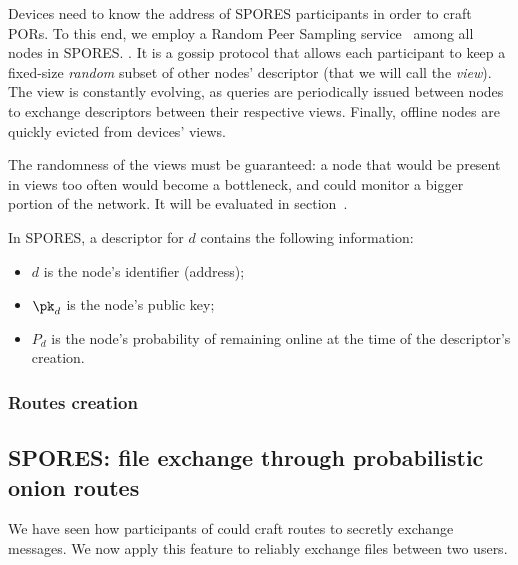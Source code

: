 Devices need to know the address of SPORES participants in order to craft PORs.
To this end, we employ a Random Peer Sampling service~\cite{Jelasity_Voulgaris_Guerraoui_Kermarrec_van_Steen_2007} among all nodes in SPORES. .
It is a gossip protocol that allows each participant to keep a fixed-size \emph{random} subset of other nodes' descriptor (that we will call the \emph{view}). 
The view is constantly evolving, as queries are periodically issued between nodes to exchange descriptors between their respective views.
Finally, offline nodes are quickly evicted from devices' views.

The randomness of the views must be guaranteed: 
a node that would be present in views too often would become a bottleneck, and could monitor a bigger portion of the network.
It will be evaluated in section~.

In SPORES, a descriptor for $d$ contains the following information:
\begin{itemize}
  \item \(d\) is the node's identifier (address);
  \item \(\pk_d\) is the node's public key;
  \item \(P_d\) is the node's probability of remaining online at the time of the descriptor's creation.
\end{itemize}


\subsubsection{Routes creation}
\label{sssec:routes_creation}



\subsection{SPORES: file exchange through probabilistic onion routes}
\label{ssec:spores_file_exchange_through_probabilistic_onion_routes}

\newcommand\finfo{\ensuremath{\mathcal{I}_f}}
\newcommand\filesize{\ensuremath{s_f}\xspace}
\newcommand\chunksize{\ensuremath{s_{\text{chunk}}}\xspace}
\newcommand\nchunks{\ensuremath{n_{\text{chunks}}}\xspace}
\newcommand\hashchunk{\ensuremath{h_{\text{chunk}}}\xspace}
\newcommand\hashfile{\ensuremath{h}\xspace}

We have seen how participants of \name could craft routes to secretly exchange messages.
We now apply this feature to reliably exchange files between two users.

